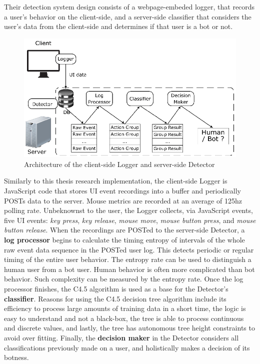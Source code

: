 Their detection system design consists of a webpage-embeded logger, that records a user's behavior on the client-side, and a server-side classifier that considers the user's data from the client-side and determines if that user is a bot or not.
\begin{figure}[!h]
    \centering
    \includegraphics[width=.8\columnwidth]{figures/bot_or_human_system_architecture}
    \caption{Architecture of the client-side Logger and server-side Detector}
    \label{fig:bot-or-human-architecture}
\end{figure}
Similarly to this thesis research implementation, the client-side Logger is JavaScript code that stores UI event recordings into a buffer and periodically POSTs data to the server.
Mouse metrics are recorded at an average of 125hz polling rate.
Unbeknownst to the user, the Logger collects, via JavaScript events, five UI events: \textit{key press}, \textit{key release}, \textit{mouse move}, \textit{mouse button press}, and \textit{mouse button release}.
When the recordings are POSTed to the server-side Detector, a \textbf{log processor} begins to calculate the timing entropy of intervals of the whole raw event data sequence in the POSTed user log.
This detects periodic or regular timing of the entire user behavior.
The entropy rate can be used to distinguish a human user from a bot user.
Human behavior is often more complicated than bot behavior.
Such complexity can be measured by the entropy rate.
Once the log processor finishes, the C4.5 algorithm is used as a base for the Detector's \textbf{classifier}.
Reasons for using the C4.5 decision tree algorithm include its efficiency to process large amounts of training data in a short time, the logic is easy to understand and not a black-box, the tree is able to process continuous and discrete values, and lastly, the tree has autonomous tree height constraints to avoid over fitting.
Finally, the \textbf{decision maker} in the Detector considers all classifications previously made on a user, and holistically makes a decision of its botness.
